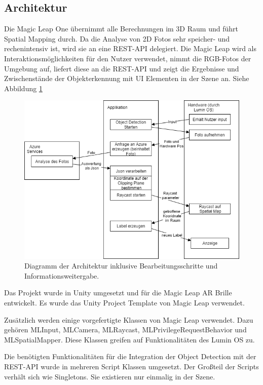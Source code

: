 \subsection{Architektur}

Die Magic Leap One übernimmt alle Berechnungen im 3D Raum und führt Spatial Mapping durch. Da die Analyse von 2D Fotos sehr speicher- und rechenintensiv ist, wird sie an eine REST-API delegiert. Die Magic Leap wird als Interaktionsmöglichkeiten für den Nutzer verwendet, nimmt die RGB-Fotos der Umgebung auf, liefert diese an die REST-API und zeigt die Ergebnisse und Zwischenstände der Objekterkennung mit UI Elementen in der Szene an. Siehe Abbildung \ref{dia:flow}

\begin{figure}[H]
	\centering
	\includegraphics[width=1\textwidth]{images/dia_flow.png}
	\caption[]{Diagramm der Architektur inklusive Bearbeitungsschritte und Informationsweitergabe.}
	\label{dia:flow}
\end{figure}

Das Projekt wurde in Unity umgesetzt und für die Magic Leap AR Brille entwickelt.
Es wurde das Unity Project Template von Magic Leap verwendet. 

Zusätzlich werden einige vorgefertigte Klassen von Magic Leap verwendet. Dazu gehören MLInput, MLCamera, MLRaycast, MLPrivilegeRequestBehavior und MLSpatialMapper. Diese Klassen greifen auf Funktionalitäten des Lumin OS zu.

Die benötigten Funktionalitäten für die Integration der Object Detection mit der REST-API wurde in mehreren Script Klassen umgesetzt. Der Großteil der Scripts verhält sich wie Singletons. Sie existieren nur einmalig in der Szene.

